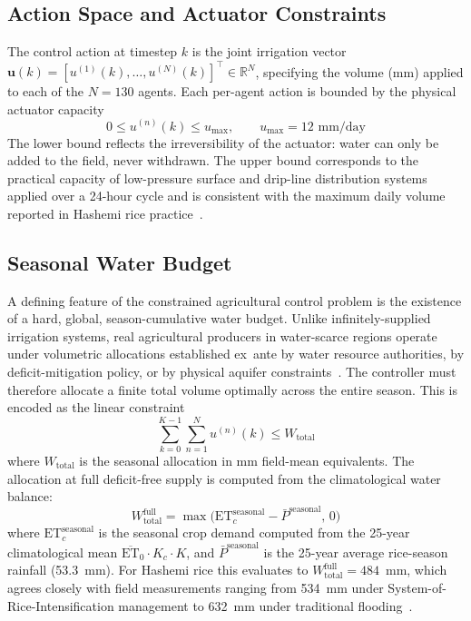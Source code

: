 \subsection{Action Space and Actuator Constraints}
\label{ssec:sys-action}

The control action at timestep $k$ is the joint irrigation vector
$\mathbf{u}(k) = [u^{(1)}(k), \ldots, u^{(N)}(k)]^{\top} \in \mathbb{R}^{N}$,
specifying the volume (mm) applied to each of the $N = 130$ agents.
Each per-agent action is bounded by the physical actuator capacity
\begin{equation}
0 \leq u^{(n)}(k) \leq u_{\max}, \qquad u_{\max} = 12 \text{ mm/day}
\label{eq:action-bound}
\end{equation}
The lower bound reflects the irreversibility of the actuator: water can
only be added to the field, never withdrawn. The upper bound corresponds
to the practical capacity of low-pressure surface and drip-line
distribution systems applied over a 24-hour cycle and is consistent with
the maximum daily volume reported in Hashemi rice
practice~\cite{jalali2021}.

\subsection{Seasonal Water Budget}
\label{ssec:sys-budget}

A defining feature of the constrained agricultural control problem is
the existence of a hard, global, season-cumulative water budget. Unlike
infinitely-supplied irrigation systems, real agricultural producers in
water-scarce regions operate under volumetric allocations established
ex~ante by water resource authorities, by deficit-mitigation policy, or
by physical aquifer constraints~\cite{Mesgaran2018,Nouri2023}. The
controller must therefore allocate a finite total volume optimally
across the entire season. This is encoded as the linear constraint
\begin{equation}
\sum_{k=0}^{K-1} \sum_{n=1}^{N} u^{(n)}(k) \leq W_{\mathrm{total}}
\label{eq:budget}
\end{equation}
where $W_{\mathrm{total}}$ is the seasonal allocation in mm field-mean
equivalents. The allocation at full deficit-free supply is computed
from the climatological water balance:
\begin{equation}
W_{\mathrm{total}}^{\mathrm{full}} =
\max\bigl(\mathrm{ET}_c^{\mathrm{seasonal}} -
\bar{P}^{\mathrm{seasonal}},\, 0\bigr)
\label{eq:Wfull}
\end{equation}
where $\mathrm{ET}_c^{\mathrm{seasonal}}$ is the seasonal crop demand
computed from the 25-year climatological mean
$\overline{\mathrm{ET}}_0 \cdot K_c \cdot K$, and
$\bar{P}^{\mathrm{seasonal}}$ is the 25-year average rice-season
rainfall (53.3~mm). For Hashemi rice this evaluates to
$W_{\mathrm{total}}^{\mathrm{full}} = 484$~mm, which agrees closely
with field measurements ranging from 534~mm under
System-of-Rice-Intensification management to 632~mm under
traditional flooding~\cite{jalali2021}.

